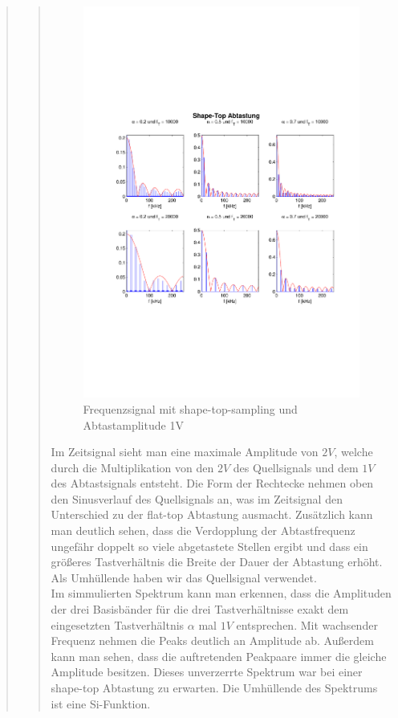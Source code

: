 \begin{quote}
\begin{quote}
  	    
  	    \begin{figure}[H]
    \centering
        \includegraphics[scale=0.7, trim = 1.5cm 6cm 1cm 8cm,
        clip]{./Bilder/shape-top-freq_1V}
            \caption{Frequenzsignal mit shape-top-sampling und Abtastamplitude
            1V}
  	    \end{figure}
  	    
  	    Im Zeitsignal sieht man eine maximale Amplitude von $2V$, welche durch
  	    die Multiplikation von den $2V$ des Quellsignals und dem $1V$ des
  	    Abtastsignals entsteht. Die Form der Rechtecke nehmen oben den
  	    Sinusverlauf des Quellsignals an, was im Zeitsignal den Unterschied zu
  	    der flat-top Abtastung ausmacht. Zusätzlich kann man deutlich sehen, dass
  	    die Verdopplung der Abtastfrequenz ungefähr doppelt so viele abgetastete Stellen ergibt und 
  	    dass ein größeres Tastverhältnis die Breite der Dauer der Abtastung erhöht. 
  	    Als Umhüllende haben wir das Quellsignal verwendet.\\
  	    Im simmulierten Spektrum kann man erkennen, dass die Amplituden der
  	    drei Basisbänder für die drei Tastverhältnisse exakt dem eingesetzten
  	    Tastverhältnis $\alpha$ mal $1V$ entsprechen. Mit wachsender Frequenz
  	    nehmen die Peaks deutlich an Amplitude ab. Außerdem kann man sehen, dass
  	    die auftretenden Peakpaare immer die gleiche Amplitude besitzen. Dieses
  	    unverzerrte Spektrum war bei einer shape-top Abtastung zu erwarten.
  	    Die Umhüllende des Spektrums ist eine Si-Funktion.
  	    

\end{quote}
\end{quote}
